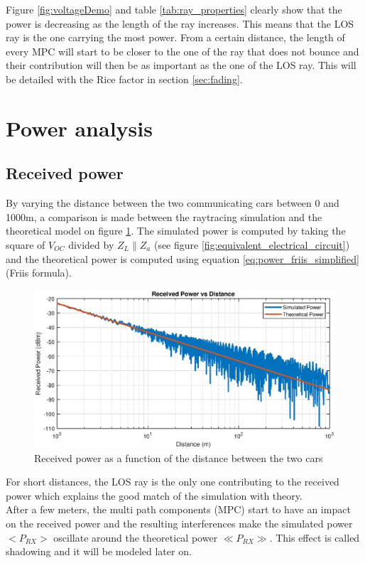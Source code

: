 \documentclass[10pt,a4paper]{ULBreport}
\begin{document}
Figure \ref{fig:voltageDemo} and table \ref{tab:ray_properties} clearly show that the power is decreasing as the length of the ray increases. This means that the LOS ray is the one carrying the most power. From a certain distance, the length of every MPC will start to be closer to the one of the ray that does not bounce and their contribution will then be as important as the one of the LOS ray. This will be detailed with the Rice factor in section \ref{sec:fading}.

\section{Power analysis}
\label{sec:power_analysis}
\subsection{Received power}
By varying the distance between the two communicating cars between 0 and 1000m, a comparison is made between the raytracing simulation and the theoretical model on figure \ref{fig:P_RX(d)}. The simulated power is computed by taking the square of $V_{OC}$ divided by $Z_L \mathbin{\|} Z_a$ (see figure \ref{fig:equivalent_electrical_circuit}) and the theoretical power is computed using equation \ref{eq:power_friis_simplified} (Friis formula).

\begin{figure}[H]
    \centering
    \includegraphics[width=1\textwidth]{3_3_log.eps}
    \caption{Received power as a function of the distance between the two cars}
    \label{fig:P_RX(d)}
\end{figure}

For short distances, the LOS ray is the only one contributing to the received power which explains the good match of the simulation with theory. \\
After a few meters, the multi path components (MPC) start to have an impact on the received power and the resulting interferences make the simulated power $<P_{RX}>$ oscillate around the theoretical power $\ll P_{RX} \gg$. This effect is called shadowing and it will be modeled later on.\\
\end{document}
